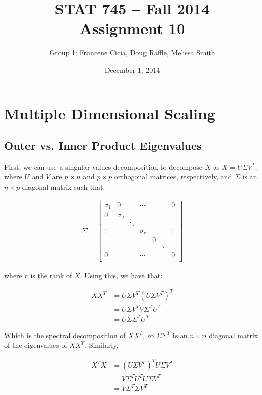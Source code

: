 \documentclass[a4paper]{article}
\title{\vspace{-30pt}STAT 745 -- Fall 2014\\Assignment 10}
\author{Group 1: Francene Cicia, Doug Raffle, Melissa Smith}
\date{December 1, 2014}
\begin{document}
\setlength{\parindent}{0pt}
\vspace{-50pt}
\maketitle

\section{Multiple Dimensional Scaling}
\subsection{Outer vs. Inner Product Eigenvalues}
First, we can use a singular values decomposition to decompose $X$ as
$X = U\Sigma V^T$, where $U$ and $V$ are $n \times n$  
and $p \times p$ orthogonal matrices, respectively, and $\Sigma$ is an
$n \times p$ diagonal matrix such that:

\begin{align*}
\Sigma = 
  \begin{bmatrix}
    \sigma_1 & 0 & & \cdots & & & 0 \\
    0 & \sigma_2 & & & & \\
    & & \ddots & & & & \\
    \vdots & & & \sigma_r & & & \vdots \\
    & & & & 0 & & \\
    & & & & & \ddots & \\
    0 & & & \cdots & & & 0 \\
  \end{bmatrix}
\end{align*}

where $r$ is the rank of $X$.  Using this, we have that:

\begin{align*}
  XX^T &= U\Sigma V^T \left(U\Sigma V^T\right)^T\\
       &= U\Sigma V^T V \Sigma^T U^T\\
       &= U \Sigma \Sigma^T U^T
\end{align*}

Which is the spectral decomposition of $XX^T$, so $\Sigma\Sigma^T$ is
an $n \times n$ diagonal matrix of the eigenvalues of $XX^T$.  Similarly,

\begin{align*}
X^TX &= \left(U\Sigma V^T\right)^T U\Sigma V^T\\
     &= V\Sigma^T U^T U\Sigma V^T\\
     &= V\Sigma^T\Sigma V^T\\
\end{align*}
\end{document}
